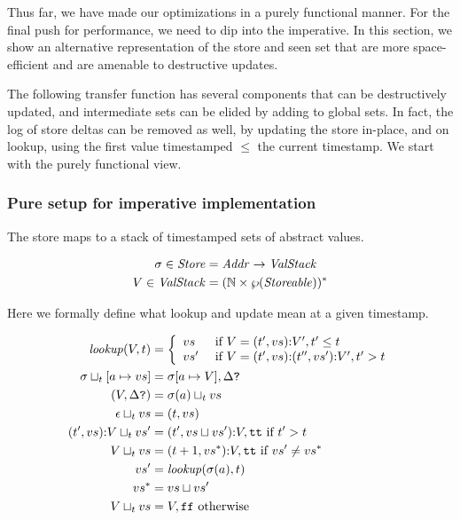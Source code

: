 \documentclass[preprint,onecolumn,9pt]{sigplanconf} %
\begin{document}
Thus far, we have made our optimizations in a purely functional
manner. For the final push for performance, we need to dip into the
imperative. In this section, we show an alternative representation of
the store and seen set that are more space-efficient and are amenable
to destructive updates.

The following transfer function has several components that can be
destructively updated, and intermediate sets can be elided by adding
to global sets. In fact, the log of store deltas can be removed as
well, by updating the store in-place, and on lookup, using the first
value timestamped $\le$ the current timestamp. We start with the
purely functional view.

\subsubsection{Pure setup for imperative implementation}

The store maps to a stack of timestamped sets of abstract values.

\begin{align*}
\sigma \in \mathit{Store} &= \mathit{Addr} \to \mathit{ValStack} \\
V \in \mathit{ValStack} &= ({\mathbb N} \times \wp(\mathit{Storeable}))^*
\end{align*}

Here we formally define what lookup and update mean at a given
timestamp.

{\small
\begin{align*}
\mathit{lookup}(V,t) &=
  \left\{
    \begin{array}{ll}
      v{s} & \text{ if } V = (t', v{s}) {\tt :} V', t' \le t \\
      v{s'} & \text{ if } V = (t', v{s}) {\tt :} (t'', v{s'}) {\tt :} V', t' > t
    \end{array}\right. \\
\sigma \sqcup_t [a \mapsto v{s}] &= \sigma[a \mapsto V],\Delta\mbox{{\tt ?}} \\
 (V,\Delta\mbox{{\tt ?}}) &= \sigma(a)\sqcup_t v{s} \\
\epsilon \sqcup_t v{s} &= (t, v{s}) \\
(t', v{s}) {\tt :} V \sqcup_t v{s'} &= (t', v{s}\sqcup v{s'}) {\tt :} V,{\tt tt} \text{ if } t' > t \\
V \sqcup_t v{s} &= (t+1, v{s^*}) {\tt :} V,{\tt tt}
           \text{ if } v{s'} \neq v{s^*} \\
 v{s'} &= \mathit{lookup}(\sigma(a),t) \\
 v{s^*} &= v{s} \sqcup v{s'} \\
V \sqcup_t v{s} &= V,{\tt ff} \text{ otherwise}
\end{align*}}
\end{document}
